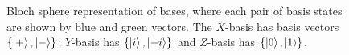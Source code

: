 \begin{figure}
    \begin{center}
        \qquad
        \qquad
        \qquad
    \end{center}
    \caption[Bloch sphere representation of bases]{
        Bloch sphere representation of bases, where each pair of basis states are shown by blue and green vectors. 
        The $X$-basis has basis vectors $\left\{ \ket{+}, \ket{-}\right\}$; $Y$-basis has $\left\{ \ket{i}, \ket{-i}\right\}$ 
            and $Z$-basis has $\left\{ \ket{0}, \ket{1}\right\}$.
    }
    \label{fig:bases}
\end{figure}

